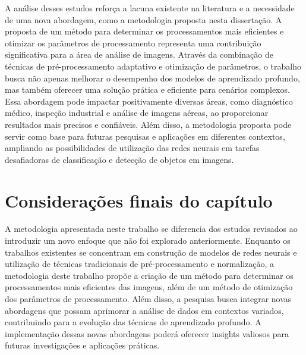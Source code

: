 A análise desses estudos reforça a lacuna existente na literatura e a necessidade de uma nova abordagem, como a metodologia proposta nesta dissertação.
A proposta de um método para determinar os processamentos mais eficientes e otimizar os parâmetros de processamento representa uma contribuição significativa para a área de análise de imagens. Através da combinação de técnicas de pré-processamento adaptativo e otimização de parâmetros, o trabalho busca não apenas melhorar o desempenho dos modelos de aprendizado profundo, mas também oferecer uma solução prática e eficiente para cenários complexos. Essa abordagem pode impactar positivamente diversas áreas, como diagnóstico médico, inspeção industrial e análise de imagens aéreas, ao proporcionar resultados mais precisos e confiáveis. Além disso, a metodologia proposta pode servir como base para futuras pesquisas e aplicações em diferentes contextos, ampliando as possibilidades de utilização das redes neurais em tarefas desafiadoras de classificação e detecção de objetos em imagens.

\section{Considerações finais do capítulo}

A metodologia apresentada neste trabalho se diferencia dos estudos revisados ao introduzir um novo enfoque que não foi explorado anteriormente. Enquanto os trabalhos existentes se concentram em construção de modelos de redes neurais e utilização de técnicas tradicionais de pré-processamento e normalização, a metodologia deste trabalho propõe a criação de um método para determinar os processamentos mais eficientes das imagens, além de um método de otimização dos parâmetros de processamento. Além disso, a pesquisa busca integrar novas abordagens que possam aprimorar a análise de dados em contextos variados, contribuindo para a evolução das técnicas de aprendizado profundo. A implementação dessas novas abordagens poderá oferecer insights valiosos para futuras investigações e aplicações práticas.